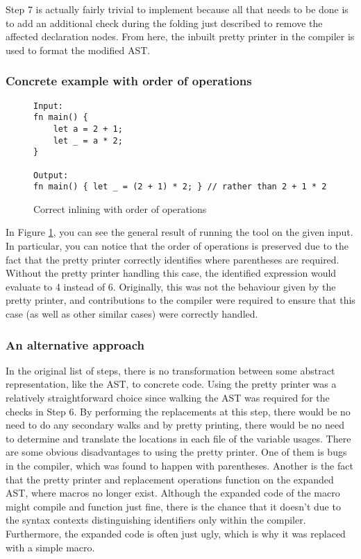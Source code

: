 Step 7 is actually fairly trivial to implement because all that needs to be done is to add an additional check during the folding just described to remove the affected declaration nodes. From here, the inbuilt pretty printer in the compiler is used to format the modified AST.

\subsubsection{Concrete example with order of operations}

\begin{figure}[h]
\centering
\begin{verbatim}
Input:
fn main() {
    let a = 2 + 1;
    let _ = a * 2;
}

Output:
fn main() { let _ = (2 + 1) * 2; } // rather than 2 + 1 * 2
\end{verbatim}
\caption{Correct inlining with order of operations}
\label{Fig:exinline}
\end{figure}

In Figure \ref{Fig:exinline}, you can see the general result of running the tool on the given input. In particular, you can notice that the order of operations is preserved due to the fact that the pretty printer correctly identifies where parentheses are required. Without the pretty printer handling this case, the identified expression would evaluate to 4 instead of 6. Originally, this was not the behaviour given by the pretty printer, and contributions to the compiler were required to ensure that this case (as well as other similar cases) were correctly handled.

\subsubsection{An alternative approach}
In the original list of steps, there is no transformation between some abstract representation, like the AST, to concrete code. Using the pretty printer was a relatively straightforward choice since walking the AST was required for the checks in Step 6. By performing the replacements at this step, there would be no need to do any secondary walks and by pretty printing, there would be no need to determine and translate the locations in each file of the variable usages. There are some obvious disadvantages to using the pretty printer. One of them is bugs in the compiler, which was found to happen with parentheses. Another is the fact that the pretty printer and replacement operations function on the expanded AST, where macros no longer exist. Although the expanded code of the macro might compile and function just fine, there is the chance that it doesn't due to the syntax contexts distinguishing identifiers only within the compiler. Furthermore, the expanded code is often just ugly, which is why it was replaced with a simple macro.

